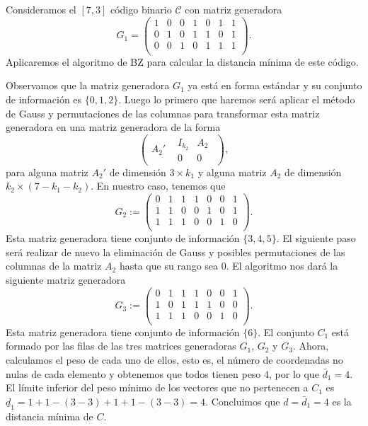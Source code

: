 \begin{exampleth}
    Consideramos el $[7, 3]$ código binario $\mathcal{C}$ con matriz generadora 
    \[
        G_1 = \left( 
            \begin{array}{ccc|cccc}
                1 & 0 & 0 & 1 & 0 & 1 & 1 \\ 
                0 & 1 & 0 & 1 & 1 & 0 & 1 \\ 
                0 & 0 & 1 & 0 & 1 & 1 & 1 \\ 
            \end{array}
            \right) .
    \]
    Aplicaremos el algoritmo de BZ para calcular la distancia mínima de este código.

    Observamos que la matriz generadora $G_1$ ya está en forma estándar y su conjunto de información es $\{ 0,1,2 \}$. Luego lo primero que haremos será aplicar el método de Gauss y permutaciones de las columnas para transformar esta matriz generadora en una matriz generadora de la forma
    \[
        \left( \begin{array}{c|c} A_{2}' & \begin{array}{c|c} I_{k_{2}} & A_{2} \\ \hline  0 & 0 \end{array} \end{array} \right),
    \]
    para alguna matriz $A_2'$ de dimensión $3 \times k_1$ y alguna matriz $A_2$ de dimensión $k_2 \times (7 - k_1 - k_2)$. En nuestro caso, tenemos que
    \[
        G_2 := \left( 
            \begin{array}{ccc|ccc|c}
                0 & 1 & 1 & 1 & 0 & 0 & 1 \\ 
                1 & 1 & 0 & 0 & 1 & 0 & 1 \\ 
                1 & 1 & 1 & 0 & 0 & 1 & 0 \\ 
            \end{array}
            \right) .
    \]
    Esta matriz generadora tiene conjunto de información $\{3,4,5\}$. El siguiente paso será realizar de nuevo la eliminación de Gauss y posibles permutaciones de las columnas de la matriz $A_2$ hasta que su rango sea $0$. El algoritmo nos dará la siguiente matriz generadora
    \[
        G_3 := \left( 
            \begin{array}{cccccc|c}
                0 & 1 & 1 & 1 & 0 & 0 & 1 \\ 
                1 & 0 & 1 & 1 & 1 & 0 & 0 \\ 
                1 & 1 & 1 & 0 & 0 & 1 & 0 \\ 
            \end{array}
            \right) .
    \]
    Esta matriz generadora tiene conjunto de información $\{6\}$. El conjunto $C_1$ está formado por las filas de las tres matrices generadoras $G_1$, $G_2$ y $G_3$. Ahora, calculamos el peso de cada uno de ellos, esto es, el número de coordenadas no nulas de cada elemento y obtenemos que todos tienen peso $4$, por lo que $\bar{d}_1 = 4$. El límite inferior del peso mínimo de los vectores que no pertenecen a $C_1$ es $\underline{d}_1 = 1 + 1 - (3-3) + 1 + 1 - (3-3) = 4$. Concluimos que $d = \bar{d}_1 = 4$ es la distancia mínima de $C$.
\end{exampleth}

